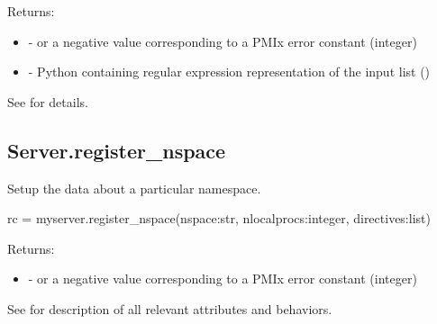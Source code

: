 \begin{arglist}
\end{arglist}

Returns:

\begin{itemize}
    \item {} -  or a negative value corresponding to a PMIx error constant (integer)
    \item {} - Python  containing regular expression representation of the input list ()
\end{itemize}

See  for details.


\subsection{Server.register_nspace}

\summary Setup the data about a particular namespace.

\format

\pyspecificstart
\begin{codepar}
rc = myserver.register_nspace(nspace:str,
                              nlocalprocs:integer,
                              directives:list)
\end{codepar}
\pyspecificend


\begin{arglist}
\end{arglist}

Returns:

\begin{itemize}
    \item {} -  or a negative value corresponding to a PMIx error constant (integer)
\end{itemize}

See  for description of all relevant attributes and behaviors.


